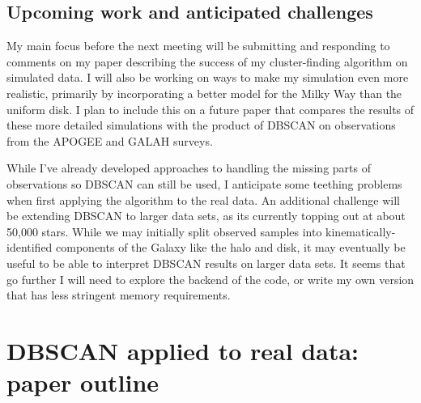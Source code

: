 \documentclass[11pt]{article}
\begin{document}
    
    \subsection*{Upcoming work and anticipated challenges}
    
    My main focus before the next meeting will be submitting and responding to comments on my paper describing the success of my cluster-finding algorithm on simulated data. I will also be working on ways to make my simulation even more realistic, primarily by incorporating a better model for the Milky Way than the uniform disk. I plan to include this on a future paper that compares the results of these more detailed simulations with the product of DBSCAN on observations from the APOGEE and GALAH surveys.
    
    While I've already developed approaches to handling the missing parts of observations so DBSCAN can still be used, I anticipate some teething problems when first applying the algorithm to the real data. An additional challenge will be extending DBSCAN to larger data sets, as its currently topping out at about 50,000 stars. While we may initially split observed samples into kinematically-identified components of the Galaxy like the halo and disk, it may eventually be useful to be able to interpret DBSCAN results on larger data sets. It seems that go further I will need to explore the backend of the code, or write my own version that has less stringent memory requirements.
	
   
 
\section*{DBSCAN applied to real data: paper outline}
\end{document}
